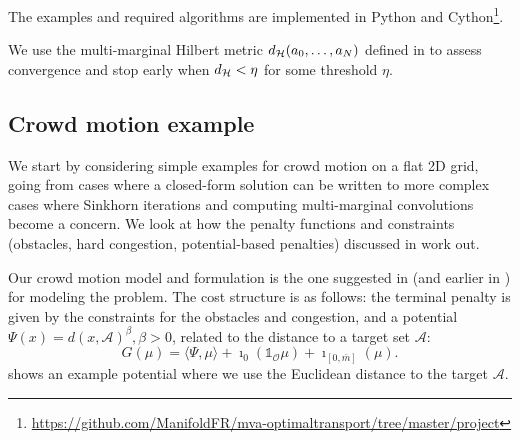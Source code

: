 \documentclass[../report.tex]{subfiles}
\begin{document}
The examples and required algorithms are implemented in Python and Cython\footnote{\url{https://github.com/ManifoldFR/mva-optimaltransport/tree/master/project}}.

We use the multi-marginal Hilbert metric $d_{\mathcal{H}}(a_0,\ldots,a_N)$ defined in \textcite[p.~16]{benamou2017generalizedIncompressible} to assess convergence and stop early when $d_{\mathcal{H}} < \eta$ for some threshold $\eta$.

\subsection{Crowd motion example}

We start by considering simple examples for crowd motion on a flat 2D grid, going from cases where a closed-form solution can be written to more complex cases where Sinkhorn iterations and computing multi-marginal convolutions become a concern. We look at how the penalty functions and constraints (obstacles, hard congestion, potential-based penalties) discussed in \textcite{benamou:hal-01295299} work out.

Our crowd motion model and formulation is the one suggested in \textcite{benamou:hal-01295299} (and earlier in \textcite{peyr2015entropic}) for modeling the problem. The cost structure is as follows: the terminal penalty is given by the constraints for the obstacles and congestion, and a potential $\Psi(x) = d(x, \mathscr A)^{\beta}, \beta > 0$, related to the distance to a target set $\mathscr{A}$:
\[
	G(\mu) = \langle \Psi, \mu\rangle + \imath_{0}(\mathds{1}_{\mathscr O}\mu)
	+ \imath_{[0,\bar{m}]}(\mu).
\]
 shows an example potential where we use the Euclidean distance to the target $\mathscr{A}$.
\end{document}
